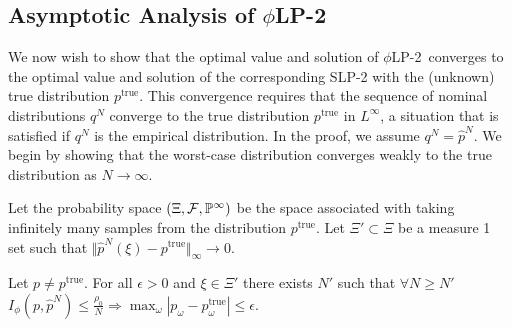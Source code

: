 \documentclass[ijoc,letterpaper]{informs3} %
\renewcommand{\P}{\mathbb{P}}
\newcommand{\ptrue}{p^{\text{true}}}
\newcommand{\plp}{$\phi$LP-2}
\begin{document}
\subsection{Asymptotic Analysis of \plp}
\label{ssec:epiconvergence}

We now wish to show that the optimal value and solution of \plp\ converges to the optimal value and solution of the corresponding SLP-2 with the (unknown) true distribution $\ptrue$.
This convergence requires that the sequence of nominal distributions $q^N$ converge to the true distribution $\ptrue$ in $L^\infty$, a situation that is satisfied if $q^N$ is the empirical distribution.
In the proof, we assume $q^N = \hat{p}^N$.
We begin by showing that the worst-case distribution converges weakly to the true distribution as $N \rightarrow \infty$.

Let the probability space $(\Xi,{\cal F},\P^\infty)$ be the space associated with taking infinitely many samples from the distribution $\ptrue$.
Let $\Xi' \subset \Xi$ be a measure 1 set such that $\Vert \hat{p}^N(\xi) - \ptrue \Vert_\infty \rightarrow 0$.

\begin{proposition} \label{prop:weak_conv}
	Let $p \neq \ptrue$.
	For all $\epsilon > 0$ and $\xi \in \Xi'$ there exists $N'$ such that $\forall N \geq N'$ $I_{\phi}(p,\hat{p}^N) \leq \frac{\rho_0}{N} \Rightarrow \max_\omega |p_\omega - \ptrue_\omega| \leq \epsilon$.
\end{proposition}
\end{document}
